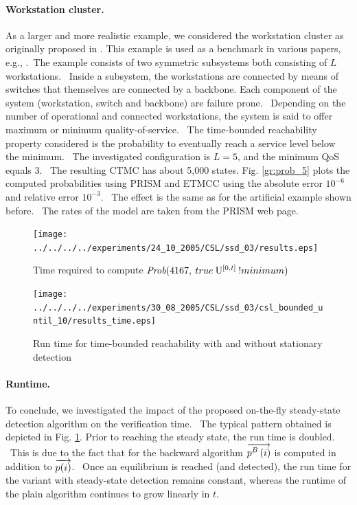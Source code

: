 \documentclass[a4paper,11pt]{article}
\begin{document}
	\paragraph{Workstation cluster. \label{ss:work_clust}}
		As a larger and more realistic example, we considered the workstation cluster as originally proposed in \cite{HaverkortHK_SRDS00}. This example is used as a benchmark in various papers, e.g., \cite{BuchholzKKT_JLAP03, YounesKNP_TACAS04, KwiatkowskaNP_IMTTCPE02, Prism_WC05}. The example consists of two symmetric subsystems both consisting of $L$ workstations.  Inside a subsystem, the workstations are connected by means of switches that themselves are connected by a backbone. Each component of the system (workstation, switch and backbone) are failure prone.  Depending on the number of operational and connected workstations, the system is said to offer maximum or minimum quality-of-service.  The time-bounded reachability property considered is the probability to eventually reach a service level below the minimum.  The investigated configuration is $L{=}5$, and the minimum QoS equals 3.  The resulting CTMC has about 5,000 states. Fig. \ref{gr:prob_5} plots the computed probabilities using PRISM and ETMCC using the absolute error $10^{{-}6}$ and relative error $10^{{-}3}$.  The effect is the same as for the artificial example shown before.  The rates of the model are taken from the PRISM web page.

	\begin{figure}[h!]
		\centering
		\begin{minipage}[t]{.49\linewidth}
			\centering
				\texttt{[image: ../../../../experiments/24\_10\_2005/CSL/ssd\_03/results.eps]}
				\caption{Time required to compute $\mbox{\it Prob}(4167, \: true \: \mathrm{U}^{[0,t]} \: !minimum )$ \label{gr:prob_5}}
		\end{minipage}
		\hfill
		\begin{minipage}[t]{.49\linewidth}
			\centering
				\texttt{[image: ../../../../experiments/30\_08\_2005/CSL/ssd\_03/csl\_bounded\_until\_10/results\_time.eps]}
				\caption{Run time for time-bounded reachability with and without stationary detection \label{gr:prob_4}}
		\end{minipage}
	\end{figure}

	\paragraph{Runtime.}
		To conclude, we investigated the impact of the proposed on-the-fly steady-state detection algorithm on the verification time.  The typical pattern obtained is depicted in Fig. \ref{gr:prob_4}. Prior to reaching the steady state, the run time is doubled.  This is due to the fact that for the backward algorithm $\overrightarrow{p^{B}\left( i \right)}$ is computed in addition to $\overrightarrow{p(i)}$.  Once an equilibrium is reached (and detected), the run time for the variant with steady-state detection remains constant, whereas the runtime of the plain algorithm continues to grow linearly in $t$.
	
\end{document}
